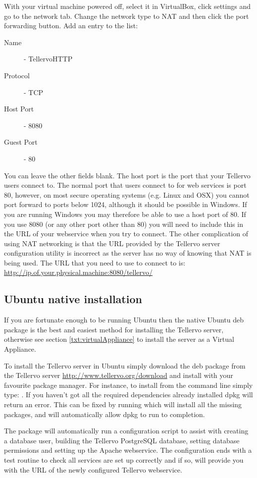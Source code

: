 With your virtual machine powered off, select it in VirtualBox, click settings and go to the network tab.  Change the network type to NAT and then click the port forwarding button.  Add an entry to the list:
\begin{description}
 \item[Name] - TellervoHTTP
 \item[Protocol] - TCP
 \item[Host Port] - 8080
 \item[Guest Port] - 80 
\end{description}
You can leave the other fields blank.  The host port is the port that your Tellervo users connect to.  The normal port that users connect to for web services is port 80, however, on most secure operating systems (e.g. Linux and OSX) you cannot port forward to ports below 1024, although it should be possible in Windows.  If you are running Windows you may therefore be able to use a host port of 80.  If you use 8080 (or any other port other than 80) you will need to include this in the URL of your webservice when you try to connect.  The other complication of using NAT networking is that the URL provided by the Tellervo server configuration utility is incorrect as the server has no way of knowing that NAT is being used.  The URL that you need to use to connect to is: \url{http://ip.of.your.physical.machine:8080/tellervo/}  


\subsection{Ubuntu native installation}
\label{txt:installnativeserver}
If you are fortunate enough to be running Ubuntu then the native Ubuntu deb package is the best and easiest method for installing the Tellervo server, otherwise see section \ref{txt:virtualAppliance} to install the server as a Virtual Appliance.  

To install the Tellervo server in Ubuntu simply download the deb package from the Tellervo server \url{http://www.tellervo.org/download} and install with your favourite package manager.  For instance, to install from the command line simply type: .  If you haven't got all the required dependencies already installed dpkg will return an error.  This can be fixed by running  which will install all the missing packages, and will automatically allow dpkg to run to completion.  

The package will automatically run a configuration script to assist with creating a database user, building the Tellervo PostgreSQL database, setting database permissions and setting up the Apache webservice.  The configuration ends with a test routine to check all services are set up correctly and if so, will provide you with the URL of the newly configured Tellervo webservice.

